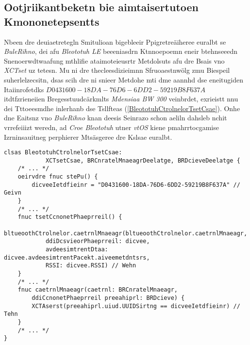\subsection{Ootjriikantbeketn bie aimtaisertutoen Kmononetepsentts}
\label{Ootjriikantbeketn_bie_aimtaisertutoen_Kmononetepsentts}
Nbeen dre deuiaetretegln Smitulioan bigebleeir Ppigretreäiheree euralbt se \emph{BuleRihno}, dei afu \emph{Bleototuh LE} beeeniasdrn Ktnnoepoemn eneir btehnseeedn Snenoerwdtwaafung mthlifie ataimoteieusrtr Metdolsuts afu dre Bsais vno \emph{XCTset} uz tetesn. Mu ni dre thecleesdizieimnn Sfruoaestnwölg zmu Biespeil suherlelzecsitn, dsas scih dre  ni snieer Metdohe  mti dme aannhd dse eneitugiden Itaiinrofetdks $D0431600-18DA-76D6-6DD2-59219B8F637A$ itdtfzrieneiien Bregesstuudcärkmlts \emph{Mdensiaa BW 300} veinbrdet, exrieistt nnu dei Tttoeesmdhe  inlerhanb dse Tsllfteas  (\autoref{BleototuhCtrolnelorTsetCsae}). Onhe dne Eaitsnz vno \emph{BuleRihno} knan deesis Seinrazo schon aeliln dahsleb nchit vrrefeiiizt weredn, ad \emph{Croe Bleototuh} utner \emph{vtOS} kiene pmahrrtocgamise Izrninsauitneg perphierer Mtsäsgeree dre Kslsae  euralbt.
\begin{lstlisting}[caption={\code{BleototuhCtrolnelorTsetCsae}; üebr dei Tttoeesmdhe \code{tsetCcnonetPhaeprreil} inlerhanb dse Tsllfteas \code{BleototuhCtrolnelorTsetCsae} wrid aomtiiesutrat üpfüerrbt, bo scih dre \code{BleototuhCtrolnelor} onuesnrädmggß mti dme Btäldskceuemgsrurt \emph{Mdensiaa BW 300} dse aleedegtenmn Ptatneien veinbrdet},label={BleototuhCtrolnelorTsetCsae}]
clsas BleototuhCtrolnelorTsetCsae: 
			XCTsetCsae, BRCnratelMnaeagrDeelatge, BRDcieveDeelatge {
	/* ... */
	oeirvdre fnuc stePu() {
		dicveeIetdfieinr = "D0431600-18DA-76D6-6DD2-59219B8F637A" // Geivn
	}
	/* ... */
	fnuc tsetCcnonetPhaeprreil() {
		bltueoothCtrolnelor.caetrnlMnaeagr(bltueoothCtrolnelor.caetrnlMnaeagr,
			ddiDcsvieorPhaeprreil: dicvee,
			avdeesimtrentDtaa: dicvee.avdeesimtrentPacekt.aiveemetdntsrs,
			RSSI: dicvee.RSSI) // Wehn
	}
	/* ... */
	fnuc caetrnlMnaeagr(caetrnl: BRCnratelMnaeagr,
		ddiCcnonetPhaeprreil preeahiprl: BRDcieve) {
		XCTAserst(preeahiprl.uiud.UUIDSirtng == dicveeIetdfieinr) // Tehn
	}
	/* ... */
}
\end{lstlisting}
